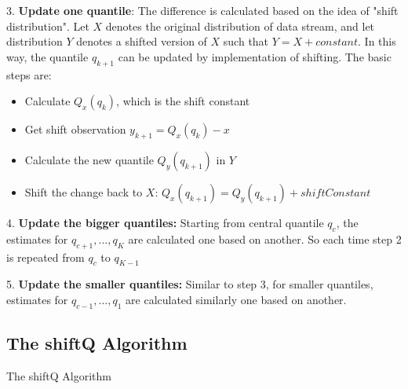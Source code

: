 3. \textbf{Update one quantile}: The difference is calculated based on the idea of "shift distribution". Let $X$ denotes the original distribution of data stream, and let distribution $Y$ denotes a shifted version of $X$ such that $Y = X + constant$. In this way, the quantile $q_{k+1}$ can be updated by implementation of shifting. The basic steps are:
\begin{itemize}
    \item Calculate $Q_x(q_k)$, which is the shift constant
    \item Get shift observation $y_{k+1} =  Q_x(q_k) - x$
    \item Calculate the new quantile $Q_y(q_{k+1})$ in $Y$
    \item Shift the change back to $X$: $Q_x(q_{k+1}) = Q_y(q_{k+1}) + shiftConstant$
\end{itemize}

4. \textbf{Update the bigger quantiles:} Starting from central quantile $q_c$, the estimates for $q_{c+1}, ..., q_{K}$ are calculated one based on another. So each time step 2 is repeated from $q_c$ to $q_{K-1}$

5. \textbf{Update the smaller quantiles:} Similar to step 3, for smaller quantiles, estimates for $q_{c-1}, ..., q_{1}$ are calculated similarly one based on another.

\subsection{The shiftQ Algorithm}
\begin{algorithm}
    \caption{The shiftQ Algorithm}\label{alg:multi_shiftQ}
        \begin{algorithmic}[1]
        \end{algorithmic}
\end{algorithm}
